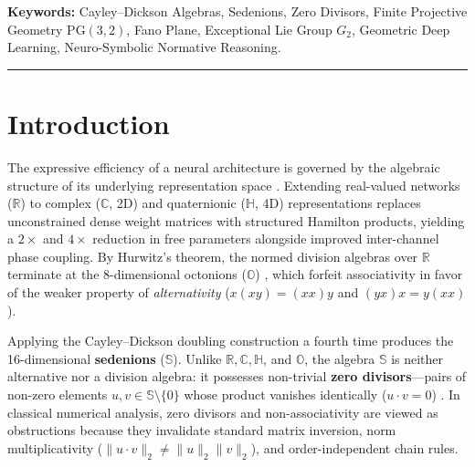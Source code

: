 \documentclass[11pt,a4paper]{article}
\theoremstyle{definition}
\theoremstyle{remark}
\newcommand{\R}{\mathbb{R}}
\newcommand{\C}{\mathbb{C}}
\newcommand{\Ha}{\mathbb{H}}
\newcommand{\Oc}{\mathbb{O}}
\newcommand{\Se}{\mathbb{S}}
\newcommand{\PG}{\mathrm{PG}}
\begin{document}
\begin{abstract}
\texttt{Birds-Electricity} exceptions) and \textbf{Long-Range Arena (LRA) ListOps} \cite{Nangia2018ListOps,Tay2021LRA} ($d \le 3 \to$ OOD $d \in \{4,\dots,8\}$) benchmarks (\texttt{bench/ext}), both \texttt{sedenion} and \texttt{sedenion\_noffn} achieve $\mathbf{100.0\%}$ OOD accuracy and $\mathbf{0.0\%}$ FCR.
\end{abstract}

\noindent\textbf{Keywords:} Cayley--Dickson Algebras, Sedenions, Zero Divisors, Finite Projective Geometry $\PG(3,2)$, Fano Plane, Exceptional Lie Group $G_2$, Geometric Deep Learning, Neuro-Symbolic Normative Reasoning.

\vspace{1em}
\hrule
\vspace{1.5em}

\section{Introduction}
\label{sec:intro}

The expressive efficiency of a neural architecture is governed by the algebraic structure of its underlying representation space \cite{Bronstein2021}. Extending real-valued networks ($\R$) to complex ($\C$, 2D) \cite{Trabelsi2018} and quaternionic ($\Ha$, 4D) \cite{Parcollet2019} representations replaces unconstrained dense weight matrices with structured Hamilton products, yielding a $2\times$ and $4\times$ reduction in free parameters alongside improved inter-channel phase coupling. By Hurwitz's theorem, the normed division algebras over $\R$ terminate at the 8-dimensional octonions ($\Oc$) \cite{Baez2002,Schafer1966}, which forfeit associativity in favor of the weaker property of \textit{alternativity} ($x(xy) = (xx)y$ and $(yx)x = y(xx)$).

Applying the Cayley--Dickson doubling construction \cite{Cayley1845,Dickson1919} a fourth time produces the 16-dimensional \textbf{sedenions} ($\Se$). Unlike $\R, \C, \Ha$, and $\Oc$, the algebra $\Se$ is neither alternative nor a division algebra: it possesses non-trivial \textbf{zero divisors}---pairs of non-zero elements $u, v \in \Se \setminus \{0\}$ whose product vanishes identically ($u \cdot v = 0$) \cite{Moreno1998}. In classical numerical analysis, zero divisors and non-associativity are viewed as obstructions because they invalidate standard matrix inversion, norm multiplicativity ($\|u \cdot v\|_2 \neq \|u\|_2 \|v\|_2$), and order-independent chain rules.
\end{document}
